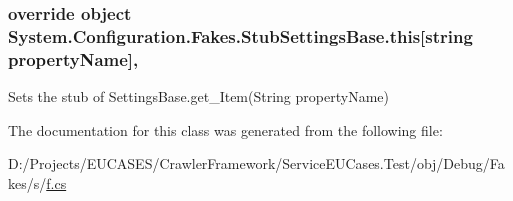 \hypertarget{class_system_1_1_configuration_1_1_fakes_1_1_stub_settings_base_aa3c6d027c46a09cebc0e32fcc5739575}{
\subsubsection[{this[string property\-Name]}]{\setlength{\rightskip}{0pt plus 5cm}override object System.\-Configuration.\-Fakes.\-Stub\-Settings\-Base.\-this\mbox{[}string property\-Name\mbox{]}\hspace{0.3cm}{\ttfamily [get]}, {\ttfamily [set]}}}\label{class_system_1_1_configuration_1_1_fakes_1_1_stub_settings_base_aa3c6d027c46a09cebc0e32fcc5739575}


Sets the stub of Settings\-Base.\-get\-\_\-\-Item(\-String property\-Name)



The documentation for this class was generated from the following file\-:\begin{DoxyCompactItemize}
\item 
D\-:/\-Projects/\-E\-U\-C\-A\-S\-E\-S/\-Crawler\-Framework/\-Service\-E\-U\-Cases.\-Test/obj/\-Debug/\-Fakes/s/\hyperlink{s_2f_8cs}{f.\-cs}\end{DoxyCompactItemize}
